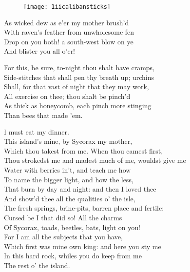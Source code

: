 \begin{figure}[tbh]
\centering
\texttt{[image: 1iicalibansticks]}
\end{figure}

\begin{verse_speech}[Caliban] 
As wicked dew as e'er my mother brush'd\\
With raven's feather from unwholesome fen\\
Drop on you both! a south-west blow on ye\\
And blister you all o'er!
\end{verse_speech}

\begin{verse_speech}[Prospero] 
For this, be sure, to-night thou shalt have cramps,\\
Side-stitches that shall pen thy breath up; urchins\\
Shall, for that vast of night that they may work,\\
All exercise on thee; thou shalt be pinch'd\\
As thick as honeycomb, each pinch more stinging\\
Than bees that made 'em.
\end{verse_speech}

\begin{verse_speech}[Caliban] 
I must eat my dinner.\\
This island's mine, by Sycorax my mother,\\
Which thou takest from me. When thou camest first,\\
Thou strokedst me and madest much of me, wouldst give me\\
Water with berries in't, and teach me how\\
To name the bigger light, and how the less,\\
That burn by day and night: and then I loved thee\\
And show'd thee all the qualities o' the isle,\\
The fresh springs, brine-pits, barren place and fertile:\\
Cursed be I that did so! All the charms\\
Of Sycorax, toads, beetles, bats, light on you!\\
For I am all the subjects that you have,\\
Which first was mine own king: and here you sty me\\
In this hard rock, whiles you do keep from me\\
The rest o' the island.
\end{verse_speech}

